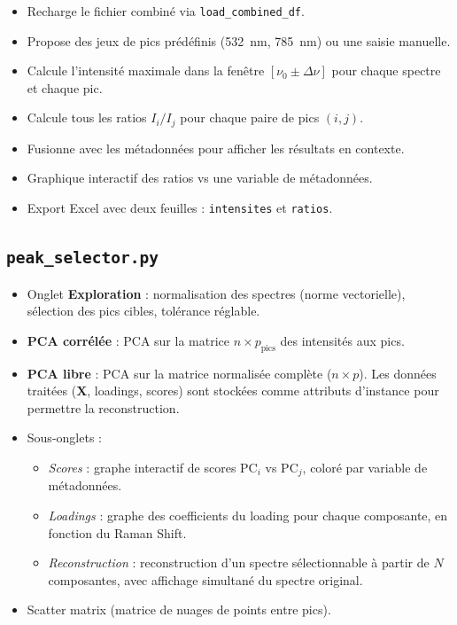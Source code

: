 \documentclass[12pt, a4paper]{article}
\newcommand{\X}{\mathbf{X}}
\begin{document}
\begin{itemize}
  \item Recharge le fichier combiné via \texttt{load\_combined\_df}.
  \item Propose des jeux de pics prédéfinis (532~nm, 785~nm) ou une saisie
        manuelle.
  \item Calcule l'intensité maximale dans la fenêtre $[\nu_0 \pm \Delta\nu]$
        pour chaque spectre et chaque pic.
  \item Calcule tous les ratios $I_i / I_j$ pour chaque paire de pics $(i, j)$.
  \item Fusionne avec les métadonnées pour afficher les résultats en contexte.
  \item Graphique interactif des ratios vs une variable de métadonnées.
  \item Export Excel avec deux feuilles : \texttt{intensites} et
        \texttt{ratios}.
\end{itemize}

\subsection{\texttt{peak\_selector.py}}

\begin{itemize}
  \item Onglet \textbf{Exploration} : normalisation des spectres (norme
        vectorielle), sélection des pics cibles, tolérance réglable.
  \item \textbf{PCA corrélée} : PCA sur la matrice $n \times p_\text{pics}$
        des intensités aux pics.
  \item \textbf{PCA libre} : PCA sur la matrice normalisée complète
        ($n \times p$). Les données traitées ($\X$, loadings, scores) sont
        stockées comme attributs d'instance pour permettre la reconstruction.
  \item Sous-onglets :
    \begin{itemize}
      \item \textit{Scores} : graphe interactif de scores PC$_i$ vs PC$_j$,
            coloré par variable de métadonnées.
      \item \textit{Loadings} : graphe des coefficients du loading pour chaque
            composante, en fonction du Raman Shift.
      \item \textit{Reconstruction} : reconstruction d'un spectre sélectionnable
            à partir de $N$ composantes, avec affichage simultané du spectre
            original.
    \end{itemize}
  \item Scatter matrix (matrice de nuages de points entre pics).
\end{itemize}
\end{document}

